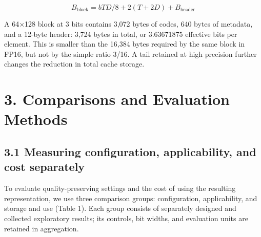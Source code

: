 \documentclass[10pt,a4paper]{article}
\begin{document}
\[
B_{\mathrm{block}}=bTD/8+2(T+2D)+B_{\mathrm{header}}
\]

A 64×128 block at 3 bits contains 3,072 bytes of codes, 640 bytes of metadata, and a 12-byte header: 3,724 bytes in total, or 3.63671875 effective bits per element. This is smaller than the 16,384 bytes required by the same block in FP16, but not by the simple ratio 3/16. A tail retained at high precision further changes the reduction in total cache storage.

\section{3. Comparisons and Evaluation Methods}\label{comparisons-and-evaluation-methods}

\subsection{3.1 Measuring configuration, applicability, and cost separately}\label{measuring-configuration-applicability-and-cost-separately}

To evaluate quality-preserving settings and the cost of using the resulting representation, we use three comparison groups: configuration, applicability, and storage and use (Table 1). Each group consists of separately designed and collected exploratory results; its controls, bit widths, and evaluation units are retained in aggregation.
\end{document}
